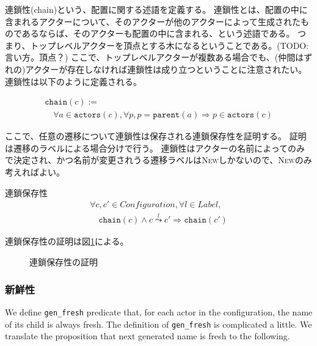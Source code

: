 連鎖性(chain)という、配置に関する述語を定義する。
連鎖性とは、配置の中に含まれるアクターについて、そのアクターが他のアクターによって生成されたものであるならば、そのアクターも配置の中に含まれる、という述語である。
つまり、トップレベルアクターを頂点とする木になるということである。(TODO:言い方。頂点？)
ここで、トップレベルアクターが複数ある場合でも、(仲間はずれの)アクターが存在しなければ連鎖性は成り立つということに注意されたい。
連鎖性は以下のように定義される。

\begin{displaymath}
  \begin{array}{l}
    \texttt{chain}(c) := \\
    \quad \forall a \in \texttt{actors}(c), \forall p, p = \texttt{parent}(a) \Rightarrow p \in \texttt{actors}(c)
  \end{array}
\end{displaymath}

ここで、任意の遷移について連鎖性は保存される連鎖保存性を証明する。
証明は遷移のラベルによる場合分けで行う。
連鎖性はアクターの名前によってのみで決定され、かつ名前が変更されうる遷移ラベルは\textsc{New}しかないので、\textsc{New}のみ考えればよい。

\begin{lemma}{連鎖保存性}
\begin{displaymath}
  \begin{array}{l}
    \forall c, c' \in \textit{Configuration}, \forall l \in \textit{Label}, \\
    \quad \texttt{chain}(c) \wedge c \overset{l}{\leadsto} c' \Rightarrow \texttt{chain}(c')
  \end{array}
\end{displaymath}
\end{lemma}

連鎖保存性の証明は図\ref{code:formalization:chain-preservation}による。

\begin{figure}[tp]
  
  \label{code:formalization:chain-preservation}
  \caption{連鎖保存性の証明}
\end{figure}

\subsubsection{新鮮性}

We define \texttt{gen\_fresh} predicate that, for each actor in the configuration, the name of its child is always fresh.
The definition of \texttt{gen\_fresh} is complicated a little.
We translate the proposition that next generated name is fresh to the following.

